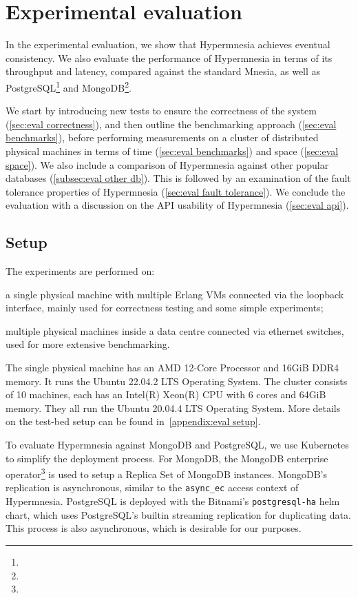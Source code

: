 \section{Experimental evaluation} \label{sec:eval}

In the experimental evaluation, we show that Hypermnesia achieves eventual consistency.
We also evaluate the performance of Hypermnesia in terms of its throughput and latency,
compared against the standard Mnesia, as well as PostgreSQL\footnote{} and MongoDB\footnote{}.

We start by introducing new tests to ensure
the correctness of the system (\cref{sec:eval correctness}), and then outline
the benchmarking approach (\cref{sec:eval benchmarks}), before performing 
measurements on a cluster of distributed physical machines in terms of
time (\cref{sec:eval benchmarks}) and space (\cref{sec:eval space}).
We also include a comparison of Hypermnesia against other popular 
databases (\cref{subsec:eval other db}).
This is followed by an examination of the fault tolerance properties of Hypermnesia
(\cref{sec:eval fault tolerance}).
We conclude the evaluation with a discussion on the API usability of 
Hypermnesia (\cref{sec:eval api}).

\subsection{Setup}

The experiments are performed on:
\begin{enumerate*}[(a)]
  \item a single physical machine with multiple Erlang VMs connected via the loopback 
  interface, mainly used for correctness testing and some simple experiments;
  \item multiple physical machines inside a data centre connected via ethernet
  switches, used for more extensive benchmarking.
\end{enumerate*}

The single physical machine has an AMD 12-Core Processor and 16GiB DDR4 memory. 
It runs the Ubuntu 22.04.2 LTS Operating System. The cluster consists
of 10 machines, each has an Intel(R) Xeon(R) CPU with 6 cores and 64GiB memory.
They all run the Ubuntu 20.04.4 LTS Operating System. More details on the test-bed
setup can be found in~\cref{appendix:eval setup}.


To evaluate Hypermnesia against MongoDB and PostgreSQL, we use Kubernetes to simplify
the deployment process. For MongoDB, the MongoDB enterprise operator\footnote{} is used
to setup a Replica Set of MongoDB instances. MongoDB's replication is asynchronous,
similar to the \verb|async_ec| access context of Hypermnesia. PostgreSQL is deployed 
with the Bitnami's \texttt{postgresql-ha} helm chart, which uses PostgreSQL's builtin
streaming replication for duplicating data. This process is also asynchronous, which
is desirable for our purposes.


